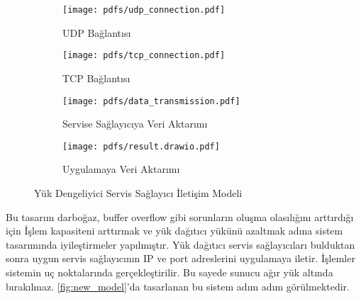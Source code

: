 \documentclass[12pt]{article}
\begin{document}
\begin{justify}
\begin{figure}[H]
    \centering
    \begin{subfigure}[b]{0.475\textwidth}
        \centering
        \texttt{[image: pdfs/udp\_connection.pdf]}
        \caption{UDP Bağlantısı}
        \label{fig:udp_diagram}
    \end{subfigure}
    \hfill
    \begin{subfigure}[b]{0.475\textwidth}
        \centering
        \texttt{[image: pdfs/tcp\_connection.pdf]}
        \caption{TCP Bağlantısı}
        \label{fig:tcp_diagram}
    \end{subfigure}
    \vfill
    \centering
    \begin{subfigure}[b]{0.475\textwidth}
        \centering
        \texttt{[image: pdfs/data\_transmission.pdf]}
        \caption{Servise Sağlayıcıya Veri Aktarımı}
        \label{fig:data_transmission}
    \end{subfigure}
    \hfill
    \begin{subfigure}[b]{0.475\textwidth}
        \centering
        \texttt{[image: pdfs/result.drawio.pdf]}
        \caption{Uygulamaya Veri Aktarımı}
        \label{fig:result}
\end{subfigure}
\caption{Yük Dengeliyici Servis Sağlayıcı İletişim Modeli}
\label{fig:old_model}
\end{figure}

Bu tasarım darboğaz, buffer overflow gibi sorunların oluşma olasılığını arttırdığı için İşlem kapasiteni arttırmak ve yük dağıtıcı yükünü azaltmak adına sistem tasarımında iyileştirmeler yapılmıştır. Yük dağıtıcı servis sağlayıcıları bulduktan sonra uygun servis sağlayıcının IP ve port adreslerini uygulamaya iletir. İşlemler sistemin uç noktalarında gerçekleştirilir. Bu sayede sunucu ağır yük altında bırakılmaz. \ref{fig:new_model}'da tasarlanan bu sistem adım adım görülmektedir. \\


\end{justify}
\end{document}
